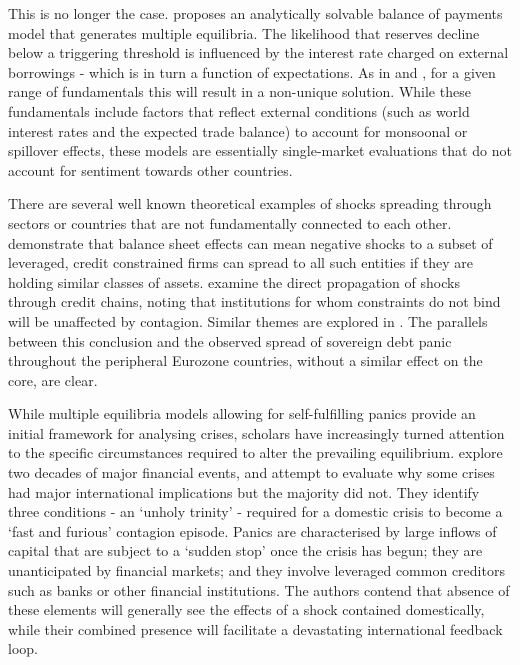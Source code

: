 \documentclass[../base.tex]{subfiles}
\begin{document}
This is no longer the case. \cite{masson1999contagion} proposes an analytically solvable balance of payments model that generates multiple equilibria. The likelihood that reserves decline below a triggering threshold is influenced by the interest rate charged on external borrowings - which is in turn a function of expectations. As in \cite{obstfeld1996models} and \cite{jeanne1997currency}, for a given range of fundamentals this will result in a non-unique solution. While these fundamentals include factors that reflect external conditions (such as world interest rates and the expected trade balance) to account for monsoonal or spillover effects, these models are essentially single-market evaluations that do not account for sentiment towards other countries. 

There are several well known theoretical examples of shocks spreading through sectors or countries that are not fundamentally connected to each other. \cite{kiyotaki2002balance} demonstrate that balance sheet effects can mean negative shocks to a subset of leveraged, credit constrained firms can spread to all such entities if they are holding similar classes of assets.  \cite{kiyotaki1997credit} examine the direct propagation of shocks through credit chains, noting that institutions for whom constraints do not bind will be unaffected by contagion. Similar themes are explored in \cite{rochet1996interbank}. The parallels between this conclusion and the observed spread of sovereign debt panic throughout the peripheral Eurozone countries, without a similar effect on the core, are clear.

While multiple equilibria models allowing for self-fulfilling panics provide an initial framework for analysing crises, scholars have increasingly turned attention to the specific circumstances required to alter the prevailing equilibrium. \cite{kaminsky2003unholy} explore two decades of major financial events, and attempt to evaluate why some crises had major international implications but the majority did not. They identify three conditions - an `unholy trinity' - required for a domestic crisis to become a `fast and furious' contagion episode. Panics are characterised by large inflows of capital that are subject to a `sudden stop' once the crisis has begun; they are unanticipated by financial markets; and they involve leveraged common creditors such as banks or other financial institutions. The authors contend that absence of these elements will generally see the effects of a shock contained domestically, while their combined presence will facilitate a devastating international feedback loop. 
\end{document}

